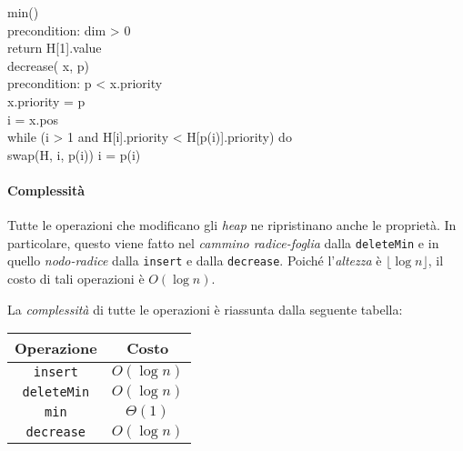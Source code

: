 \begin{codecont}
    \ind{} min()\\
        precondition: dim > 0\\
        return H[1].value\\
    
    \ind decrease( x,  p)\\
        precondition: p < x.priority\\
        x.priority = p\\
         i = x.pos\\
        while (i > 1 and H[i].priority < H[p(i)].priority) do\\
            \indf swap(H, i, p(i))\hfill{}
            \indf i = p(i)
\end{codecont}
\paragraph{Complessità}
Tutte le operazioni che modificano gli \emph{heap} ne ripristinano anche le
proprietà. In particolare, questo viene fatto nel \emph{cammino radice-foglia}
dalla \texttt{deleteMin} e in quello \emph{nodo-radice} dalla \texttt{insert}
e dalla \texttt{decrease}. Poiché l'\emph{altezza} è $\lfloor\log n\rfloor$, il
costo di tali operazioni è $O(\log n)$.

\bigskip\noindent
La \emph{complessità} di tutte le operazioni è riassunta dalla seguente tabella:
\begin{table}[h!]
    \centering
    \renewcommand{\arraystretch}{1.2}
    \begin{tabular}{|c|c|}
        \hline
        \textbf{Operazione} & \textbf{Costo}\\
        \hline
        \texttt{insert} & $O(\log n)$\\
        \hline
        \texttt{deleteMin} & $O(\log n)$\\
        \hline
        \texttt{min} & $\Theta(1)$\\
        \hline
        \texttt{decrease} & $O(\log n)$\\
        \hline
    \end{tabular}
\end{table}

